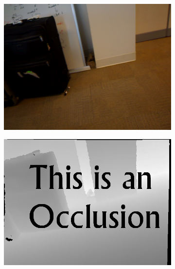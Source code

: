 \documentclass[preprint,10pt,5p,times,twocolumn]{elsarticle}
\begin{document}
\begin{figure}[t]
\begin{center}
\begin{subfigure}[b]{0.136\linewidth}
    \includegraphics[width=\linewidth]{case_structure_missing_color.png}
    \caption{}
    \label{fig:structure_missing_color}
\end{subfigure}
\begin{subfigure}[b]{0.136\linewidth}
    \includegraphics[width=\linewidth]{case_structure_missing_depth.png}
    \caption{}
    \label{fig:structure_missing_depth}
\end{subfigure}
\begin{subfigure}[b]{0.136\linewidth}

\end{subfigure}
\end{center}
\end{figure}
\end{document}
